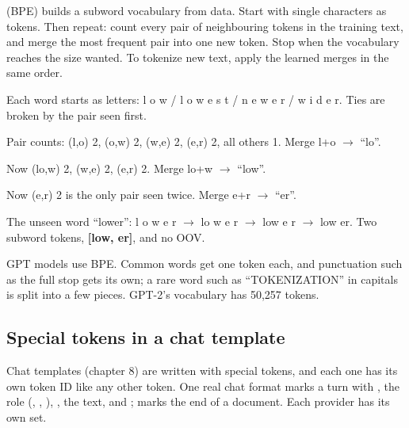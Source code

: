 \begin{definition}
 (BPE) builds a subword vocabulary from data. Start with single characters as tokens. Then repeat: count every pair of neighbouring tokens in the training text, and merge the most frequent pair into one new token. Stop when the vocabulary reaches the size wanted. To tokenize new text, apply the learned merges in the same order.
\end{definition}

\begin{example}
Each word starts as letters: l o w / l o w e s t / n e w e r / w i d e r. Ties are broken by the pair seen first.
\begin{steps}
  \item Pair counts: (l,o) 2, (o,w) 2, (w,e) 2, (e,r) 2, all others 1. Merge l+o $\to$ ``lo''.
  \item Now (lo,w) 2, (w,e) 2, (e,r) 2. Merge lo+w $\to$ ``low''.
  \item Now (e,r) 2 is the only pair seen twice. Merge e+r $\to$ ``er''.
  \item The unseen word ``lower'': l o w e r $\to$ lo w e r $\to$ low e r $\to$ low er. Two subword tokens, \textbf{[low, er]}, and no OOV.
\end{steps}
\end{example}

\begin{remark}
GPT models use BPE. Common words get one token each, and punctuation such as the full stop gets its own; a rare word such as ``TOKENIZATION'' in capitals is split into a few pieces. GPT-2's vocabulary has 50,257 tokens.
\end{remark}

\subsection*{Special tokens in a chat template}

\begin{remark}
Chat templates (chapter 8) are written with special tokens, and each one has its own token ID like any other token. One real chat format marks a turn with , the role (, , ), , the text, and ;  marks the end of a document. Each provider has its own set.
\end{remark}

